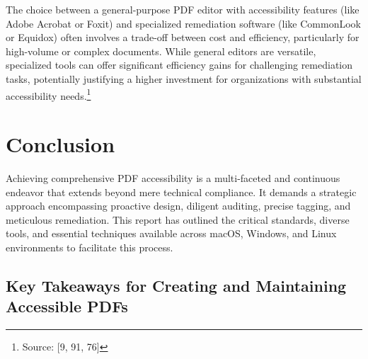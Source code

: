 The choice between a general-purpose PDF editor with accessibility features (like Adobe Acrobat or Foxit) and specialized remediation software (like CommonLook or Equidox) often involves a trade-off between cost and efficiency, particularly for high-volume or complex documents. While general editors are versatile, specialized tools can offer significant efficiency gains for challenging remediation tasks, potentially justifying a higher investment for organizations with substantial accessibility needs.\footnote{Source: [9, 91, 76]}

\section{Conclusion}

Achieving comprehensive PDF accessibility is a multi-faceted and continuous endeavor that extends beyond mere technical compliance. It demands a strategic approach encompassing proactive design, diligent auditing, precise tagging, and meticulous remediation. This report has outlined the critical standards, diverse tools, and essential techniques available across macOS, Windows, and Linux environments to facilitate this process.

\subsection{Key Takeaways for Creating and Maintaining Accessible PDFs}

